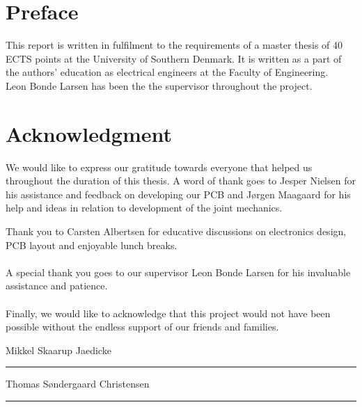 
\section*{Preface}
This report is written in fulfilment to the requirements of a master thesis of 40 ECTS points at the University of Southern Denmark.
It is written as a part of the authors' education as electrical engineers at the Faculty of Engineering.
\\
Leon Bonde Larsen has been the the supervisor throughout the project.

\section*{Acknowledgment}

We would like to express our gratitude towards everyone that helped us throughout the duration of this thesis.
A word of thank goes to Jesper Nielsen for his assistance and feedback on developing our PCB and Jørgen Maagaard for his help and ideas in relation to development of the joint mechanics. 

Thank you to Carsten Albertsen for educative discussions on electronics design, PCB layout and enjoyable lunch breaks. 
\\~\\
A special thank you goes to our supervisor Leon Bonde Larsen for his invaluable assistance and patience.
\\~\\
Finally, we would like to acknowledge that this project would not have been possible without the endless support of our friends and families.


\vspace{0.5cm}
\begin{center}
	\begin{minipage}[t]{.49\textwidth}\large
		\begin{center}
		Mikkel Skaarup Jaedicke\\
		\vspace{1cm}
		\hrule
		\vspace{0.5cm}
		Thomas Søndergaard Christensen
		\vspace{1cm}
		\hrule
		\end{center} 
	\end{minipage}
\end{center}

